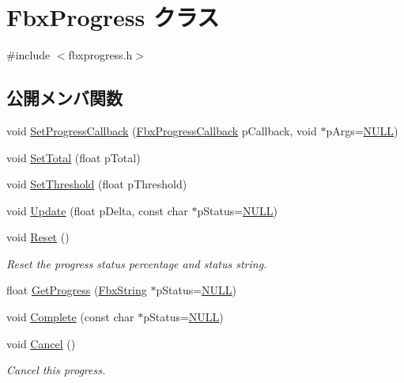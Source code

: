 \hypertarget{class_fbx_progress}{}\section{Fbx\+Progress クラス}
\label{class_fbx_progress}


{\ttfamily \#include $<$fbxprogress.\+h$>$}

\subsection*{公開メンバ関数}
\begin{DoxyCompactItemize}
\item 
void \hyperlink{class_fbx_progress_a8d165798c9c75bdf2498d7a6840220aa}{Set\+Progress\+Callback} (\hyperlink{fbxprogress_8h_a3765040904b462fb1f2673caba3488db}{Fbx\+Progress\+Callback} p\+Callback, void $\ast$p\+Args=\hyperlink{fbxarch_8h_a070d2ce7b6bb7e5c05602aa8c308d0c4}{N\+U\+LL})
\item 
void \hyperlink{class_fbx_progress_a5a704be350a16f935729750888644040}{Set\+Total} (float p\+Total)
\item 
void \hyperlink{class_fbx_progress_a0f2eeea6d21c0917acde3e9c08a5a649}{Set\+Threshold} (float p\+Threshold)
\item 
void \hyperlink{class_fbx_progress_ac67f9c160f7ffc09e9c7454b3bfa6b06}{Update} (float p\+Delta, const char $\ast$p\+Status=\hyperlink{fbxarch_8h_a070d2ce7b6bb7e5c05602aa8c308d0c4}{N\+U\+LL})
\item 
void \hyperlink{class_fbx_progress_a5f7149e7ac9e7dd29eae9f3ebada5418}{Reset} ()
\begin{DoxyCompactList}\small\item\em Reset the progress status percentage and status string. \end{DoxyCompactList}\item 
float \hyperlink{class_fbx_progress_a63376b77e48aaaaf6ff86924132572b1}{Get\+Progress} (\hyperlink{class_fbx_string}{Fbx\+String} $\ast$p\+Status=\hyperlink{fbxarch_8h_a070d2ce7b6bb7e5c05602aa8c308d0c4}{N\+U\+LL})
\item 
void \hyperlink{class_fbx_progress_a90e010980f9db7fd525ef8a2e0a9a471}{Complete} (const char $\ast$p\+Status=\hyperlink{fbxarch_8h_a070d2ce7b6bb7e5c05602aa8c308d0c4}{N\+U\+LL})
\item 
void \hyperlink{class_fbx_progress_a6d335a5a18efc63d4a73d5eeedf78516}{Cancel} ()
\begin{DoxyCompactList}\small\item\em Cancel this progress. \end{DoxyCompactList}\item 

\end{DoxyCompactItemize}
